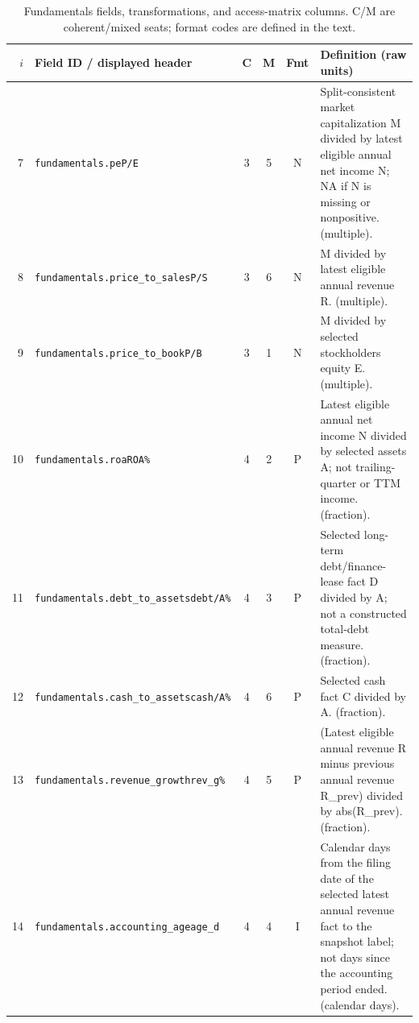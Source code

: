 \begin{table}[t]
\caption{Fundamentals fields, transformations, and access-matrix columns. C/M are coherent/mixed seats; format codes are defined in the text.}
\label{tab:repro-fundamentals}
\small
\begin{tabular}{@{}rp{}cccp{}@{}}
\toprule
$i$ & Field ID / displayed header & C & M & Fmt & Definition (raw units) \\
\midrule
7 & \texttt{fundamentals.\allowbreak{}pe}\newline \texttt{P/\allowbreak{}E} & 3 & 5 & N & Split-consistent market capitalization M divided by latest eligible annual net income N; NA if N is missing or nonpositive. (multiple). \\[2pt]
8 & \texttt{fundamentals.\allowbreak{}price\_\allowbreak{}to\_\allowbreak{}sales}\newline \texttt{P/\allowbreak{}S} & 3 & 6 & N & M divided by latest eligible annual revenue R. (multiple). \\[2pt]
9 & \texttt{fundamentals.\allowbreak{}price\_\allowbreak{}to\_\allowbreak{}book}\newline \texttt{P/\allowbreak{}B} & 3 & 1 & N & M divided by selected stockholders equity E. (multiple). \\[2pt]
10 & \texttt{fundamentals.\allowbreak{}roa}\newline \texttt{ROA\%} & 4 & 2 & P & Latest eligible annual net income N divided by selected assets A; not trailing-quarter or TTM income. (fraction). \\[2pt]
11 & \texttt{fundamentals.\allowbreak{}debt\_\allowbreak{}to\_\allowbreak{}assets}\newline \texttt{debt/\allowbreak{}A\%} & 4 & 3 & P & Selected long-term debt/finance-lease fact D divided by A; not a constructed total-debt measure. (fraction). \\[2pt]
12 & \texttt{fundamentals.\allowbreak{}cash\_\allowbreak{}to\_\allowbreak{}assets}\newline \texttt{cash/\allowbreak{}A\%} & 4 & 6 & P & Selected cash fact C divided by A. (fraction). \\[2pt]
13 & \texttt{fundamentals.\allowbreak{}revenue\_\allowbreak{}growth}\newline \texttt{rev\_\allowbreak{}g\%} & 4 & 5 & P & (Latest eligible annual revenue R minus previous annual revenue R\_prev) divided by abs(R\_prev). (fraction). \\[2pt]
14 & \texttt{fundamentals.\allowbreak{}accounting\_\allowbreak{}age}\newline \texttt{age\_\allowbreak{}d} & 4 & 4 & I & Calendar days from the filing date of the selected latest annual revenue fact to the snapshot label; not days since the accounting period ended. (calendar days). \\[2pt]
\bottomrule
\end{tabular}
\end{table}

